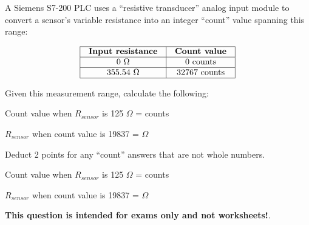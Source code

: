 

A Siemens S7-200 PLC uses a ``resistive transducer'' analog input module to convert a sensor's variable resistance into an integer ``count'' value spanning this range:


$$\vbox{\offinterlineskip
\halign{\strut
\vrule \quad\hfil # \ \hfil & 
\vrule \quad\hfil # \ \hfil \vrule \cr
\noalign{\hrule}
%
{\bf Input resistance} & {\bf Count value} \cr
%
\noalign{\hrule}
%
0 $\Omega$ & 0 counts \cr
%
\noalign{\hrule}
%
355.54 $\Omega$ & 32767 counts \cr
%
\noalign{\hrule}
} %
}$$ %

Given this measurement range, calculate the following:

\vskip 30pt

\noindent
Count value when $R_{sensor}$ is 125 $\Omega$ = \underbar{\hskip 50pt} counts

\vskip 30pt

\noindent
$R_{sensor}$ when count value is 19837 = \underbar{\hskip 50pt} $\Omega$

\vskip 20pt







Deduct 2 points for any ``count'' answers that are not whole numbers.

\vskip 10pt

\noindent
Count value when $R_{sensor}$ is 125 $\Omega$ =  counts

\vskip 10pt

\noindent
$R_{sensor}$ when count value is 19837 =  $\Omega$







{\bf This question is intended for exams only and not worksheets!}.


